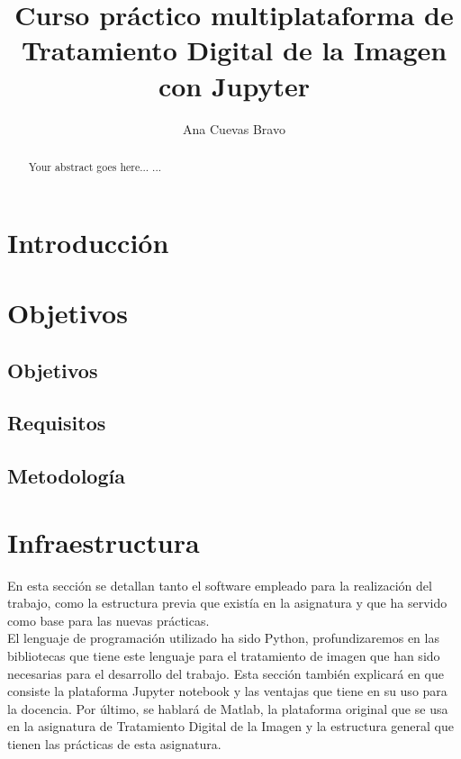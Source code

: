 \documentclass[a4paper,12pt]{report}
\begin{document}
\title{Curso práctico multiplataforma de Tratamiento Digital de la Imagen con Jupyter}
\author{ Ana Cuevas Bravo}
\maketitle

\newpage
{}

\renewcommand{\abstractname}{Resumen}
\renewcommand{\chaptername}{Capítulo}

\begin{abstract}
Your abstract goes here...
...
\end{abstract}


\tableofcontents
\newpage
{}

\renewcommand{\abstractname}{Resumen}


\chapter{Introducción}


\chapter{Objetivos}
\section{Objetivos}
\section{Requisitos}
\section{Metodología}

\chapter{Infraestructura}

En esta sección se detallan tanto el software empleado para la realización del trabajo, como la estructura previa que existía en la asignatura y que ha servido como base para las nuevas prácticas. \\

 El lenguaje de programación utilizado ha sido Python, profundizaremos en las bibliotecas que tiene este lenguaje para el tratamiento de imagen que han sido necesarias para el desarrollo del trabajo. Esta sección también explicará en que consiste la plataforma Jupyter notebook y las ventajas que tiene en su uso para la docencia. Por último, se hablará de Matlab, la plataforma original que se usa en la asignatura de Tratamiento Digital de la Imagen y la estructura general que tienen las prácticas de esta asignatura.
\end{document}
